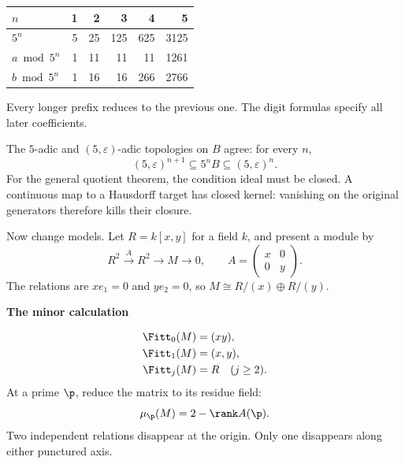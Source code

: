 \begin{center}\small
\begin{tabular}{@{}lrrrrr@{}}\toprule
$n$ & 1 & 2 & 3 & 4 & 5\\\midrule
$5^n$ & 5 & 25 & 125 & 625 & 3125\\
$a\bmod5^n$ & 1 & 11 & 11 & 11 & 1261\\
$b\bmod5^n$ & 1 & 16 & 16 & 266 & 2766\\\bottomrule
\end{tabular}
\end{center}
Every longer prefix reduces to the previous one. The digit formulas specify all later coefficients.

The $5$-adic and $(5,\varepsilon)$-adic topologies on $B$ agree: for every $n$,
\[
(5,\varepsilon)^{n+1}\subseteq 5^nB\subseteq(5,\varepsilon)^n.
\]
For the general quotient theorem, the condition ideal must be closed. A continuous map to a Hausdorff target has closed kernel: vanishing on the original generators therefore kills their closure.



Now change models. Let $R=k[x,y]$ for a field $k$, and present a module by
\[
R^2\xrightarrow{A}R^2\longrightarrow M\longrightarrow0,
\qquad
A=\begin{pmatrix}x&0\\0&y\end{pmatrix}.
\]
The relations are $xe_1=0$ and $ye_2=0$, so $M\cong R/(x)\oplus R/(y)$.

\begin{minipage}[c]{.48\linewidth}
\end{minipage}\hfill
\begin{minipage}[c]{.48\linewidth}
{\sffamily\bfseries The minor calculation}\par
\[
\begin{aligned}
\Fitt_0(M)&=(xy),\\
\Fitt_1(M)&=(x,y),\\
\Fitt_j(M)&=R\quad(j\ge2).
\end{aligned}
\]
At a prime $\p$, reduce the matrix to its residue field:
\[
\mu_{\p}(M)=2-\rank A(\p).
\]
Two independent relations disappear at the origin. Only one disappears along either punctured axis.
\end{minipage}

